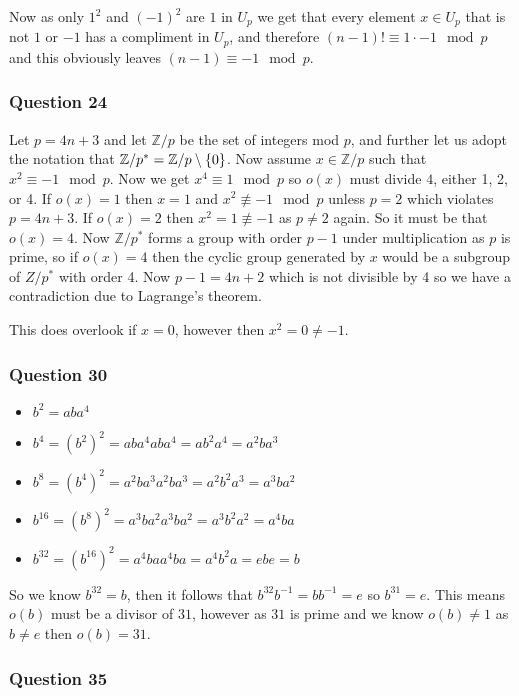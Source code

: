 \documentclass{article}
\begin{document}
Now as only $1^2$ and $(-1)^2$ are $1$ in $U_p$ we get that every element $x \in U_p$ that is not $1$ or $-1$ has a compliment in $U_p$, and therefore $(n-1)! \equiv 1\cdot -1 \mod p$ and this obviously leaves $(n-1) \equiv -1 \mod p$.


\subsubsection{Question 24}

Let $p = 4n+3$ and let $\mathbb Z/p$ be the set of integers mod $p$, and further let us adopt the notation that $\mathbb Z/p^* = \mathbb Z/p \setminus \left\{ {0} \right\}$. Now assume $x \in \mathbb Z/p$ such that $x^2 \equiv -1 \mod p$. Now we get $x^4 \equiv 1 \mod p$ so $o(x)$ must divide $4$, either 1, 2, or 4. If $o(x) = 1$ then $x=1$ and $x^2\not \equiv -1 \mod p$ unless $p = 2$ which violates $p = 4n+3$. If $o(x) = 2$ then $x^2 = 1 \not\equiv -1$ as $p\not=2$ again. So it must be that $o(x) = 4$. Now $\mathbb Z/p^*$ forms a group with order $p-1$ under multiplication as $p$ is prime, so if $o(x) = 4$ then the cyclic group generated by $x$ would be a subgroup of $Z/p^*$ with order 4. Now $p-1 = 4n+2$ which is not divisible by 4 so we have a contradiction due to Lagrange's theorem.

This does overlook if $x = 0$, however then $x^2 = 0 \not = -1$.

\subsubsection{Question 30}
\begin{itemize}
	\item $b^2 = aba^4$
	\item $b^4 = \left(b^2\right)^2 = aba^4aba^4 = ab^2a^4 = a^2ba^3$
	\item $b^8 = \left(b^4\right)^2 = a^2ba^3a^2ba^3 = a^2b^2a^3 = a^3ba^2$
	\item $b^{16} = \left(b^8\right)^2 = a^3ba^2a^3ba^2 = a^3b^2a^2 = a^4ba$
	\item $b^{32} = \left(b^{16}\right)^2 = a^4baa^4ba = a^4b^2a = ebe = b$
\end{itemize}

So we know $b^{32} = b$, then it follows that $b^{32}b^{-1} = bb^{-1} = e$ so $b^{31} = e$. This means $o(b)$ must be a divisor of $31$, however as $31$ is prime and we know $o(b)\not= 1$ as $b \not= e$ then $o(b) = 31$.
\subsubsection{Question 35}
\end{document}
